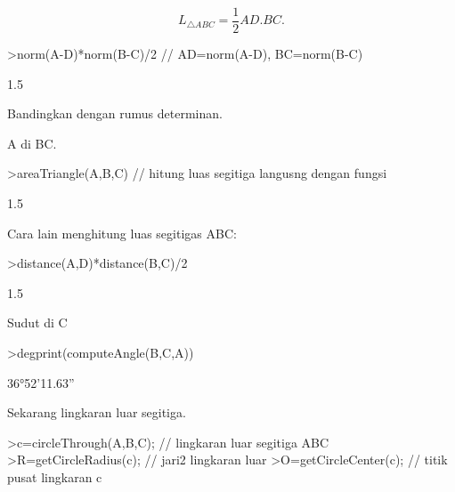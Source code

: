 \documentclass[12pt,arial,letterpaper]{book}
\begin{document}
\begin{eulercomment}
\begin{eulercomment}
\begin{eulercomment}
\begin{eulercomment}
\begin{eulercomment}
\begin{eulercomment}
\begin{eulercomment}
\begin{eulercomment}
\begin{eulercomment}
\begin{eulercomment}
\begin{eulercomment}
\begin{eulercomment}
\begin{eulercomment}
\begin{eulercomment}
\begin{eulercomment}
\begin{eulercomment}
\begin{eulercomment}
\begin{eulercomment}
\begin{eulercomment}
\begin{eulercomment}
\begin{eulercomment}
\begin{eulercomment}
\begin{eulercomment}
\begin{eulercomment}
\begin{eulercomment}
\end{eulercomment}
\begin{eulerformula}
\[
L_{\triangle ABC}= \frac{1}{2}AD.BC.
\]
\end{eulerformula}
\begin{eulerprompt}
>norm(A-D)*norm(B-C)/2 // AD=norm(A-D), BC=norm(B-C)
\end{eulerprompt}
\begin{euleroutput}
  1.5
\end{euleroutput}
\begin{eulercomment}
Bandingkan dengan rumus determinan.\\
\end{eulercomment}
\begin{eulerttcomment}
 A di BC.
\end{eulerttcomment}
\begin{eulerprompt}
>areaTriangle(A,B,C) // hitung luas segitiga langusng dengan fungsi
\end{eulerprompt}
\begin{euleroutput}
  1.5
\end{euleroutput}
\begin{eulercomment}
Cara lain menghitung luas segitigas ABC:
\end{eulercomment}
\begin{eulerprompt}
>distance(A,D)*distance(B,C)/2
\end{eulerprompt}
\begin{euleroutput}
  1.5
\end{euleroutput}
\begin{eulercomment}
Sudut di C
\end{eulercomment}
\begin{eulerprompt}
>degprint(computeAngle(B,C,A))
\end{eulerprompt}
\begin{euleroutput}
  36°52'11.63''
\end{euleroutput}
\begin{eulercomment}
Sekarang lingkaran luar segitiga.
\end{eulercomment}
\begin{eulerprompt}
>c=circleThrough(A,B,C); // lingkaran luar segitiga ABC
>R=getCircleRadius(c); // jari2 lingkaran luar 
>O=getCircleCenter(c); // titik pusat lingkaran c 

\end{eulerprompt}
\end{eulercomment}
\end{eulercomment}
\end{eulercomment}
\end{eulercomment}
\end{eulercomment}
\end{eulercomment}
\end{eulercomment}
\end{eulercomment}
\end{eulercomment}
\end{eulercomment}
\end{eulercomment}
\end{eulercomment}
\end{eulercomment}
\end{eulercomment}
\end{eulercomment}
\end{eulercomment}
\end{eulercomment}
\end{eulercomment}
\end{eulercomment}
\end{eulercomment}
\end{eulercomment}
\end{eulercomment}
\end{eulercomment}
\end{eulercomment}
\end{document}
